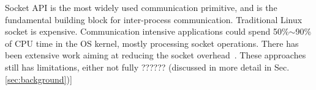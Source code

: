 Socket API is the most widely used communication primitive, and is the fundamental building block for inter-process communication. Traditional Linux socket is expensive. Communication intensive applications could spend 50\%$\sim$90\% of CPU time in the OS kernel, mostly processing socket operations. There has been extensive work aiming at reducing the socket overhead~\cite{peter2016arrakis,belay2017ix,yasukata2016stackmap,lin2016scalable,han2012megapipe,jeong2014mtcp,baumann2009multikernel,lin2016scalable,han2012megapipe,jeong2014mtcp,baumann2009multikernel,dunkels2001design,jeong2014mtcp,libvma,openonload,nishtala2013scaling,lin2016scalable,belay2017ix}. These approaches still has limitations, either not fully ?????? (discussed in more detail in Sec.\ref{sec:background})]



